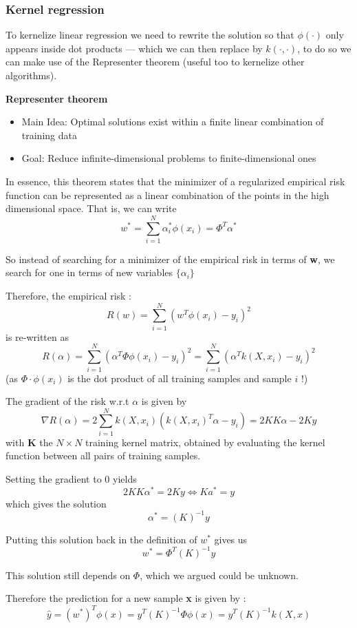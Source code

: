 \subsubsection{Kernel regression}
To kernelize linear regression we need to rewrite the solution so that $\phi(\cdot)$ only appears inside dot products — which we can then replace by $k(\cdot,\cdot)$, to do so we can make use of the Representer theorem (useful too to kernelize other algorithms). 

\textbf{Representer theorem}

\begin{itemize}
  \item Main Idea: Optimal solutions exist within a finite linear combination of training data 
  \item Goal: Reduce infinite-dimensional problems to finite-dimensional ones
\end{itemize} 

In essence, this theorem states that the minimizer of a
regularized empirical risk function can be represented as a
linear combination of the points in the high dimensional
space. That is, we can write
\[
  w^* = \sum_{i=1}^{N}\alpha_i^* \phi(x_i) = \Phi^T \alpha^*
\]

So instead of searching for a minimizer of the empirical risk in
terms of \textbf{w}, we search for one in terms of new variables $\{ \alpha _i \}$

Therefore, the empirical risk : \[
  R(w) = \sum_{i=1}^{N}(w^T \phi(x_i) - y_i)^2 
\]
is re-written as 
\[
  R(\alpha) = \sum_{i=1}^{N}(\alpha ^T \Phi \phi (x_i) - y_i)^2 = \sum_{i=1}^{N} (\alpha ^T k(X, x_i) - y_i)^2 
\] (as $\Phi \cdot \phi(x_i)$ is the dot product of all training samples and sample $i$ !)

The gradient of the risk w.r.t $\alpha$ is given by \[
  \nabla R(\alpha) = 2 \sum_{i=1}^{N} k(X,x_i)(k(X,x_i)^T \alpha - y_i) = 2KK \alpha - 2 Ky
\] with \textbf{K} the $N \times N$ training kernel matrix, obtained by evaluating the kernel function between all pairs of training samples. 

Setting the gradient to 0 yields \[
  2KK \alpha^* = 2Ky \iff Ka^* = y
\]which gives the solution \[
\alpha ^* = (K)^{-1} y
\] 

Putting this solution back in the definition of $w^*$ gives us \[
  w^* = \Phi^T(K)^{-1}y
\]

This solution still depends on $\Phi$, which we argued could be unknown. 

Therefore the prediction for a new sample \textbf{x} is given by :\[
  \hat{y} = (w^*)^T \phi(x) = y^T (K)^{-1} \Phi \phi(x) = y^T (K)^{-1}k(X,x)
\]

